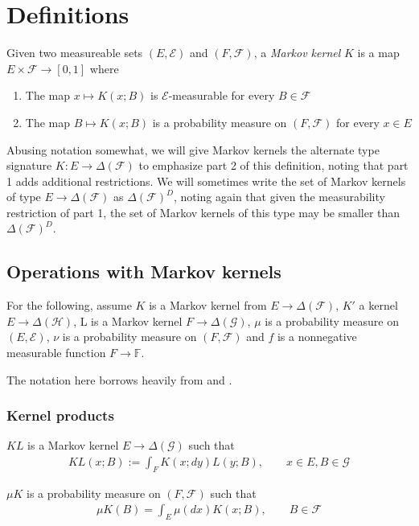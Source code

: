 \section{Definitions}
Given two measureable sets $(E,\mathcal{E})$ and $(F,\mathcal{F})$, a \emph{Markov kernel} $K$ is a map $E\times \mathcal{F} \to [0,1]$ where
\begin{enumerate}
    \item The map $x\mapsto K(x;B)$ is $\mathcal{E}$-measurable for every $B\in\mathcal{F}$
    \item The map $B\mapsto K(x;B)$ is a probability measure on $(F,\mathcal{F})$ for every $x\in E$ 
\end{enumerate}

Abusing notation somewhat, we will give Markov kernels the alternate type signature $K:E\to \Delta(\mathcal{F})$ to emphasize part 2 of this definition, noting that part 1 adds additional restrictions. We will sometimes write the set of Markov kernels of type $E\to \Delta(\mathcal{F})$ as $\Delta(\mathcal{F})^D$, noting again that given the measurability restriction of part 1, the set of Markov kernels of this type may be smaller than $\Delta(\mathcal{F})^D$.

\subsection{Operations with Markov kernels}

For the following, assume $K$ is a Markov kernel from $E\to \Delta(\mathcal{F})$, $K'$ a kernel $E\to \Delta(\mathcal{H})$, L is a Markov kernel $F\to \Delta(\mathcal{G})$, $\mu$ is a probability measure on $(E,\mathcal{E})$, $\nu$ is a probability measure on $(F,\mathcal{F})$ and $f$ is a nonnegative measurable function $F\to \mathbb{F}$.

The notation here borrows heavily from \cite{cinlar_probability_2011} and \cite{fong_causal_2013}.

\subsubsection{Kernel products}

$KL$ is a Markov kernel $E\to \Delta(\mathcal{G})$ such that
\begin{align}
    KL(x;B):= \int_F K(x;dy) L(y;B),\qquad x\in E, B\in \mathcal{G}
\end{align}

$\mu K$ is a probability measure on $(F,\mathcal{F})$ such that
\begin{align}
    \mu K(B)=\int_E \mu(dx) K(x;B),\qquad B\in\mathcal{F}
\end{align}

